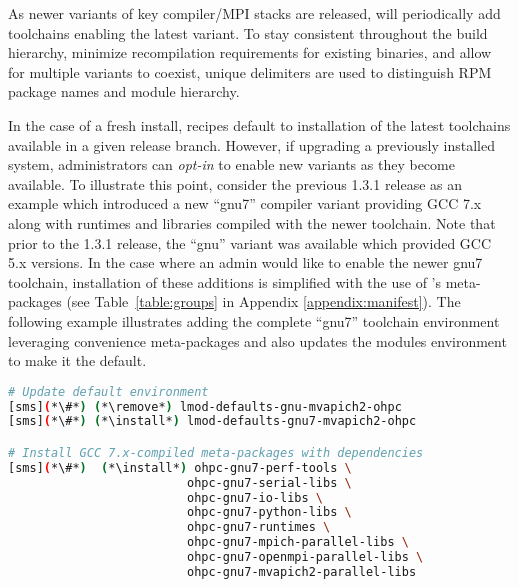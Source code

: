 As newer variants of key compiler/MPI stacks are released, \OHPC{} will
periodically add toolchains enabling the latest variant. To stay consistent
throughout the build hierarchy, minimize recompilation requirements for existing
binaries, and allow for multiple variants to coexist, unique delimiters are
used to distinguish RPM package names and module hierarchy.

In the case of a fresh install, \OHPC{} recipes default to installation of the
latest toolchains available in a given release branch. However, if upgrading a
previously installed system, administrators can {\em opt-in} to enable new
variants as they become available. To illustrate this point, consider the
previous \OHPC{}
1.3.1 release as an example which introduced a new {``gnu7''} compiler variant
providing GCC 7.x along with runtimes and libraries compiled
with the newer toolchain. Note that prior to the 1.3.1 release, the {``gnu''} variant was
available which provided GCC 5.x versions.
In the case where an admin would like to enable the newer {gnu7} toolchain,
installation of these additions is simplified
with the use of \OHPC{}'s meta-packages (see Table~\ref{table:groups} in Appendix 
\ref{appendix:manifest}).
The following example illustrates adding the complete ``gnu7'' toolchain
environment leveraging convenience meta-packages and also updates the modules environment to make it the default.

\begin{lstlisting}[language=bash,keywords={}]
# Update default environment
[sms](*\#*) (*\remove*) lmod-defaults-gnu-mvapich2-ohpc
[sms](*\#*) (*\install*) lmod-defaults-gnu7-mvapich2-ohpc

# Install GCC 7.x-compiled meta-packages with dependencies
[sms](*\#*)  (*\install*) ohpc-gnu7-perf-tools \
                         ohpc-gnu7-serial-libs \
                         ohpc-gnu7-io-libs \
                         ohpc-gnu7-python-libs \
                         ohpc-gnu7-runtimes \
                         ohpc-gnu7-mpich-parallel-libs \
                         ohpc-gnu7-openmpi-parallel-libs \
                         ohpc-gnu7-mvapich2-parallel-libs
\end{lstlisting}

